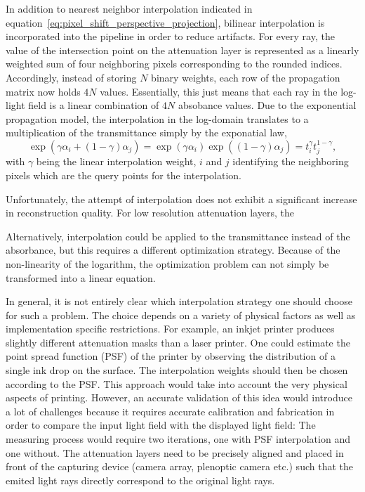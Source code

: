In addition to nearest neighbor interpolation indicated in equation~\ref{eq:pixel_shift_perspective_projection}, bilinear interpolation is incorporated into the pipeline in order to reduce artifacts.
For every ray, the value of the intersection point on the attenuation layer is represented as a linearly weighted sum of four neighboring pixels corresponding to the rounded indices.
Accordingly, instead of storing $N$ binary weights, each row of the propagation matrix now holds $4 N$ values.
Essentially, this just means that each ray in the log-light field is a linear combination of $4 N$ absobance values.
Due to the exponential propagation model, the interpolation in the log-domain translates to a multiplication of the transmittance simply by the exponatial law,
\begin{equation*}	
	\exp( \gamma \alpha_i + (1 - \gamma) \alpha_j ) = \exp( \gamma \alpha_i ) \exp( (1 - \gamma) \alpha_j ) = t_i^{\gamma} t_j^{1 - \gamma},
\end{equation*}
with $\gamma$ being the linear interpolation weight, $i$ and $j$ identifying the neighboring pixels which are the query points for the interpolation.

Unfortunately, the attempt of interpolation does not exhibit a significant increase in reconstruction quality.
For low resolution attenuation layers, the 

Alternatively, interpolation could be applied to the transmittance instead of the absorbance, but this requires a different optimization strategy.
Because of the non-linearity of the logarithm, the optimization problem can not simply be transformed into a linear equation.

In general, it is not entirely clear which interpolation strategy one should choose for such a problem.
The choice depends on a variety of physical factors as well as implementation specific restrictions.
For example, an inkjet printer produces slightly different attenuation masks than a laser printer.
One could estimate the point spread function (PSF) of the printer by observing the distribution of a single ink drop on the surface.
The interpolation weights should then be chosen according to the PSF.
This approach would take into account the very physical aspects of printing.
However, an accurate validation of this idea would introduce a lot of challenges because it requires accurate calibration and fabrication in order to compare the input light field with the displayed light field:
The measuring process would require two iterations, one with PSF interpolation and one without.
The attenuation layers need to be precisely aligned and placed in front of the capturing device (camera array, plenoptic camera etc.) such that the emited light rays directly correspond to the original light rays.

